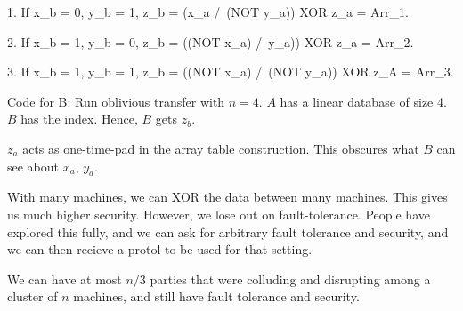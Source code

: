 1. If x_b = 0, y_b = 1,
z_b = (x_a /\ (NOT y_a)) XOR z_a = Arr_1.


2. If x_b = 1, y_b = 0,
z_b = ((NOT x_a) /\ y_a)) XOR z_a = Arr_2.


3. If x_b = 1, y_b = 1,
z_b = ((NOT x_a) /\ (NOT y_a)) XOR z_A = Arr_3.


Code for B:
Run oblivious transfer with $n = 4$. $A$ has a linear database of size 4. $B$ has the index.
Hence, $B$ gets $z_b$.


$z_a$ acts as one-time-pad in the array table construction. This obscures
what $B$ can see about $x_a$, $y_a$.


With many machines, we can XOR the data between many machines. This gives us much higher security.
However, we lose out on fault-tolerance. People have explored this fully, and we can ask for arbitrary fault tolerance and security,
and we can then recieve a protol to be used for that setting.

We can have at most $n/3$ parties that were colluding and disrupting among a cluster of $n$ machines, and still have
fault tolerance and security.

